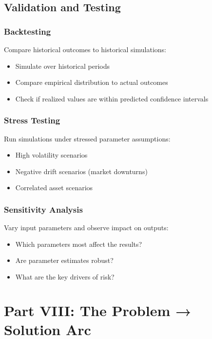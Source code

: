 \documentclass[12pt,a4paper]{article}
\begin{document}
\subsection{Validation and Testing}

\subsubsection{Backtesting}

Compare historical outcomes to historical simulations:
\begin{itemize}
    \item Simulate over historical periods
    \item Compare empirical distribution to actual outcomes
    \item Check if realized values are within predicted confidence intervals
\end{itemize}

\subsubsection{Stress Testing}

Run simulations under stressed parameter assumptions:
\begin{itemize}
    \item High volatility scenarios
    \item Negative drift scenarios (market downturns)
    \item Correlated asset scenarios
\end{itemize}

\subsubsection{Sensitivity Analysis}

Vary input parameters and observe impact on outputs:
\begin{itemize}
    \item Which parameters most affect the results?
    \item Are parameter estimates robust?
    \item What are the key drivers of risk?
\end{itemize}

\newpage

\section{Part VIII: The Problem → Solution Arc}
\end{document}
